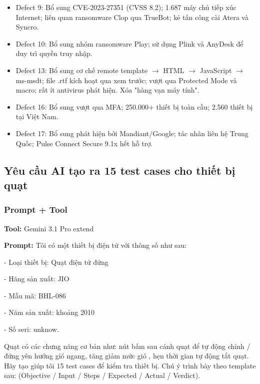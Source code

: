 \begin{itemize}
    \item Defect 9: Bổ sung CVE-2023-27351 (CVSS 8.2); 1.687 máy chủ tiếp xúc Internet; liên quan ransomware Clop qua TrueBot; kẻ tấn công cài Atera và Syncro.
    \item Defect 10: Bổ sung nhóm ransomware Play; sử dụng Plink và AnyDesk để duy trì quyền truy nhập.
    \item Defect 13: Bổ sung cơ chế remote template $\rightarrow$ HTML $\rightarrow$ JavaScript $\rightarrow$ ms-msdt; file .rtf kích hoạt qua xem trước; vượt qua Protected Mode và macro; rất ít antivirus phát hiện. Xóa "hàng vạn máy tính".
    \item Defect 16: Bổ sung vượt qua MFA; 250.000+ thiết bị toàn cầu; 2.560 thiết bị tại Việt Nam.
    \item Defect 17: Bổ sung phát hiện bởi Mandiant/Google; tác nhân liên hệ Trung Quốc; Pulse Connect Secure 9.1x hết hỗ trợ.
\end{itemize}

\subsection{Yêu cầu AI tạo ra 15 test cases cho thiết bị quạt}

\subsubsection{Prompt + Tool}

\textbf{Tool:} Gemini 3.1 Pro extend

\textbf{Prompt:}
Tôi có một thiết bị điện tử với thông số như sau: 
\vspace{0.1cm}

- Loại thiết bị: Quạt điện tử đứng 
\vspace{0.1cm}

- Hãng sản xuất: JIO 
\vspace{0.1cm}

- Mẫu mã: BHL-086 
\vspace{0.1cm}

- Năm sản xuất: khoảng 2010 
\vspace{0.1cm}

- Số seri: unknow. 
\vspace{0.1cm}

Quạt có các chưng năng cơ bản như: nút bấm sau cánh quạt để tự động chỉnh / đứng yên hướng gió ngang, tăng giảm mức gió , hẹn thời gian tự động tắt quạt. Hãy tạo giúp tôi 15 test cases để kiểm tra thiết bị. Chú ý trình bày theo template sau:  (Objective / Input / Steps / Expected / Actual / Verdict).


